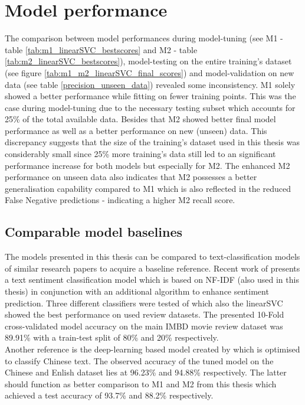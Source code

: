 \section{Model performance} \label{disussion_model_performance}
The comparison between model performances during model-tuning (see M1 - table \ref{tab:m1_linearSVC_bestscores} and M2 - table \ref{tab:m2_linearSVC_bestscores}), model-testing on the entire training's dataset (see figure \ref{tab:m1_m2_linearSVC_final_scores}) and model-validation on new data (see table \ref{precision_unseen_data}) revealed some inconsistency. M1 solely showed a better performance while fitting on fewer training points. This was the case during model-tuning due to the necessary testing subset which accounts for 25\% of the total available data. Besides that M2 showed better final model performance as well as a better performance on new (unseen) data. This discrepancy suggests that the size of the training's dataset used in this thesis was considerably small since 25\% more training's data still led to an significant performance increase for both models but especially for M2. The enhanced M2 performance on unseen data also indicates that M2 possesses a better generalisation capability compared to M1 which is also reflected in the reduced False Negative predictions - indicating a higher M2 recall score.

\subsection*{Comparable model baselines}
The models presented in this thesis can be compared to text-classification models of similar research papers to acquire a baseline reference. Recent work of \parencite{Das2018} presents a text sentiment classification model which is based on NF-IDF (also used in this thesis) in conjunction with an additional algorithm to enhance sentiment prediction. Three different classifiers were tested of which also the linearSVC showed the best performance on used review datasets. The presented 10-Fold cross-validated model accuracy on the main IMBD movie review dataset was 89.91\% with a train-test split of 80\% and 20\% respectively.\\
Another reference is the deep-learning based model created by \parencite{Li2018} which is optimised to classify Chinese text. The observed accuracy of the tuned model on the Chinese and Enlish dataset lies at 96.23\% and 94.88\% respectively. The latter should function as better comparison to M1 and M2 from this thesis which achieved a test accuracy of 93.7\% and 88.2\% respectively.